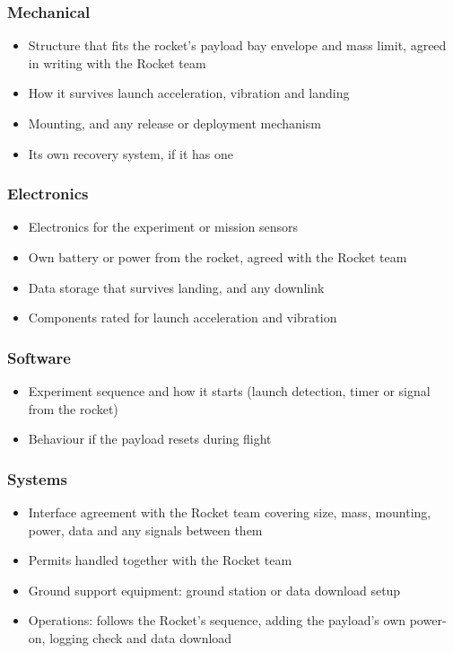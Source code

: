 \documentclass{../../Common/Latex/Templates/rapport}
\begin{document}
\subsubsection*{Mechanical}
\begin{itemize}
  \item Structure that fits the rocket's payload bay envelope and mass limit, agreed in writing with the Rocket team
  \item How it survives launch acceleration, vibration and landing
  \item Mounting, and any release or deployment mechanism
  \item Its own recovery system, if it has one
\end{itemize}

\subsubsection*{Electronics}
\begin{itemize}
  \item Electronics for the experiment or mission sensors
  \item Own battery or power from the rocket, agreed with the Rocket team
  \item Data storage that survives landing, and any downlink
  \item Components rated for launch acceleration and vibration
\end{itemize}

\subsubsection*{Software}
\begin{itemize}
  \item Experiment sequence and how it starts (launch detection, timer or signal from the rocket)
  \item Behaviour if the payload resets during flight
\end{itemize}

\subsubsection*{Systems}
\begin{itemize}
  \item Interface agreement with the Rocket team covering size, mass, mounting, power, data and any signals between them
  \item Permits handled together with the Rocket team
  \item Ground support equipment: ground station or data download setup
  \item Operations: follows the Rocket's sequence, adding the payload's own power-on, logging check and data download
\end{itemize}
\end{document}
